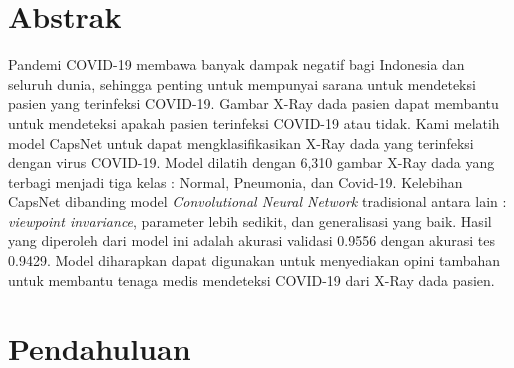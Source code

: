\documentclass{article}
\begin{document}
  \section*{Abstrak}
  \par Pandemi COVID-19 membawa banyak dampak negatif bagi Indonesia dan seluruh dunia, sehingga penting untuk mempunyai sarana untuk mendeteksi  pasien yang terinfeksi COVID-19. Gambar X-Ray dada pasien dapat membantu untuk mendeteksi apakah pasien terinfeksi COVID-19 atau tidak. Kami melatih model CapsNet untuk dapat mengklasifikasikan X-Ray dada yang terinfeksi dengan virus COVID-19. Model dilatih dengan 6,310 gambar X-Ray dada yang terbagi menjadi tiga kelas : Normal, Pneumonia, dan Covid-19. Kelebihan CapsNet dibanding model \textit{Convolutional Neural Network} tradisional antara lain : \textit{viewpoint invariance}, parameter lebih sedikit, dan generalisasi yang baik. Hasil yang diperoleh dari model ini adalah akurasi validasi 0.9556 dengan akurasi tes 0.9429. Model diharapkan dapat digunakan untuk menyediakan opini tambahan untuk membantu tenaga medis mendeteksi COVID-19 dari X-Ray dada pasien.
  \newpage
  \tableofcontents
  \newpage
  \section{Pendahuluan}
\end{document}
